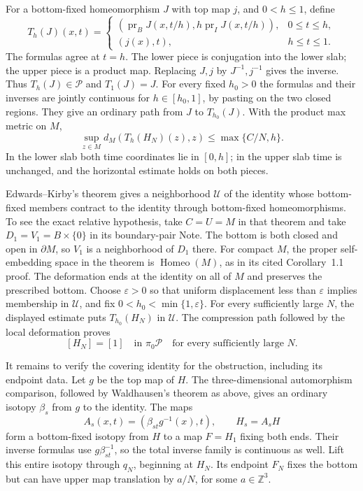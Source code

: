 For a bottom-fixed homeomorphism $J$ with top map $j$, and $0<h\leq1$,
define
\[
 T_h(J)(x,t)=
 \begin{cases}
  (\operatorname{pr}_BJ(x,t/h),
                h\operatorname{pr}_IJ(x,t/h)),&0\leq t\leq h,\\
  (j(x),t),&h\leq t\leq1.
 \end{cases}
\]
The formulas agree at $t=h$.  The lower piece is conjugation
into the lower slab; the upper piece is a product map.
Replacing $J,j$ by $J^{-1},j^{-1}$ gives the inverse.
Thus $T_h(J)\in\mathcal P$ and $T_1(J)=J$.
For every fixed $h_0>0$ the formulas and their inverses are jointly
continuous for $h\in[h_0,1]$, by pasting on the two closed regions.
They give an ordinary path from $J$ to $T_{h_0}(J)$.
With the product max metric on $M$,
\[
 \sup_{z\in M}d_M(T_h(H_N)(z),z)\leq\max\{C/N,h\}.
\]
In the lower slab both time coordinates lie in $[0,h]$; in the
upper slab time is unchanged, and the horizontal estimate holds
on both pieces.

Edwards--Kirby's theorem gives a neighborhood $\mathcal U$ of the
identity whose bottom-fixed members contract to the identity through
bottom-fixed homeomorphisms.  To see the exact relative hypothesis,
take $C=U=M$ in that theorem and take
$D_1=V_1=B\times\{0\}$ in its boundary-pair Note.  The bottom
is both closed and open in $\partial M$, so $V_1$ is a neighborhood
of $D_1$ there.  For compact $M$, the proper self-embedding space
in the theorem is $\operatorname{Homeo}(M)$, as in its cited
Corollary~1.1 proof.  The deformation ends at the identity on all
of $M$ and preserves the prescribed bottom.
Choose $\varepsilon>0$ so that uniform displacement less than
$\varepsilon$ implies membership in $\mathcal U$, and fix
$0<h_0<\min\{1,\varepsilon\}$.  For every sufficiently large $N$,
the displayed estimate puts $T_{h_0}(H_N)$ in $\mathcal U$.
The compression path followed by the local deformation proves
\begin{equation}\label{eq:three-torus-large-cover-component}
 [H_N]=[1]\quad\text{in }\pi_0\mathcal P
 \quad\text{for every sufficiently large }N.
\end{equation}

It remains to verify the covering identity for the obstruction,
including its endpoint data.  Let $g$ be the top map of $H$.
The three-dimensional automorphism comparison, followed by
Waldhausen's theorem as above, gives an ordinary isotopy
$\beta_s$ from $g$ to the identity.  The maps
\[
 A_s(x,t)=(\beta_{st}g^{-1}(x),t),\qquad H_s=A_sH
\]
form a bottom-fixed isotopy from $H$ to a map $F=H_1$ fixing
both ends.  Their inverse formulas use $g\beta_{st}^{-1}$,
so the total inverse family is continuous as well.
Lift this entire isotopy through $q_N$, beginning at $H_N$.
Its endpoint $F_N$ fixes the bottom but can have upper map
translation by $a/N$, for some $a\in\mathbb Z^3$.

